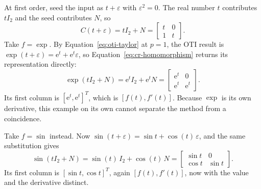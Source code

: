 \documentclass[10pt]{article}
\begin{document}
At first order, seed the input as $t+\varepsilon$ with $\varepsilon^2=0$. The
real number $t$ contributes $tI_2$ and the seed contributes $N$, so
\[
 C(t+\varepsilon)=tI_2+N=\begin{bmatrix}t&0\\1&t\end{bmatrix}.
\]
Take $f=\exp$. By Equation~\eqref{eq:oti-taylor} at $p=1$, the OTI result is
$\exp(t+\varepsilon)=\mathrm e^{t}+\mathrm e^{t}\varepsilon$, so
Equation~\eqref{eq:cr-homomorphism} returns its representation directly:
\[
 \exp(tI_2+N)=\mathrm e^{t}I_2+\mathrm e^{t}N
 =\begin{bmatrix}\mathrm e^{t}&0\\ \mathrm e^{t}&\mathrm e^{t}\end{bmatrix}.
\]
Its first column is $[\mathrm e^{t},\mathrm e^{t}]^{T}$, which is
$[f(t),f'(t)]$. Because $\exp$ is its own derivative, this example on its own
cannot separate the method from a coincidence.

Take $f=\sin$ instead. Now
$\sin(t+\varepsilon)=\sin t+\cos(t)\,\varepsilon$, and the same substitution
gives
\[
 \sin(tI_2+N)=\sin(t)\,I_2+\cos(t)\,N
 =\begin{bmatrix}\sin t&0\\ \cos t&\sin t\end{bmatrix}.
\]
Its first column is $[\sin t,\cos t]^{T}$, again $[f(t),f'(t)]$, now with the
value and the derivative distinct.
\end{document}
